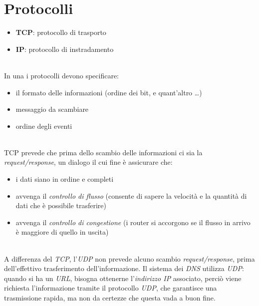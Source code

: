 \section{Protocolli}
\begin{itemize}
    \item \textbf{TCP}: protocollo di trasporto
    \item \textbf{IP}: protocollo di instradamento
\end{itemize}
\\
In una  i protocolli devono specificare:
\begin{itemize}
    \item il formato delle informazioni (ordine dei bit, e quant'altro \ldots)
    \item messaggio da scambiare
    \item ordine degli eventi
\end{itemize}
\\
TCP prevede che prima dello scambio delle informazioni ci sia la \textit{request/response}, un dialogo il cui fine è assicurare che:
\begin{itemize}
    \item i dati siano in ordine e completi
    \item avvenga il \textit{controllo di flusso} (consente di sapere la velocità e la quantità di dati che è possibile trasferire)
    \item avvenga il \textit{controllo di congestione} (i router si accorgono se il flusso in arrivo è maggiore di quello in uscita)
\end{itemize}
\\
A differenza del \textit{TCP}, l'\textit{UDP} non prevede alcuno scambio \textit{request/response}, prima dell'effettivo trasferimento dell'informazione. Il sistema dei \textit{DNS} utilizza \textit{UDP}: quando si ha un \textit{URL}, bisogna ottenerne l'\textit{indirizzo IP} associato, perciò viene richiesta l'informazione tramite il protocollo \textit{UDP}, che garantisce una trasmissione rapida, ma non da certezze che questa vada a buon fine.

